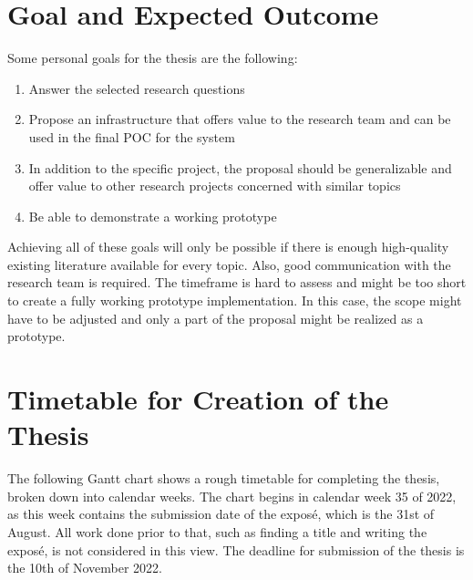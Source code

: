 \newpage
\section{Goal and Expected Outcome}

Some personal goals for the thesis are the following:
\begin{enumerate}
    \item Answer the selected research questions
    \item Propose an infrastructure that offers value to the research team
    and can be used in the final \ac{POC} for the system
    \item In addition to the specific project, the proposal should
    be generalizable and offer value to other research projects concerned with similar topics
    \item Be able to demonstrate a working prototype
\end{enumerate}

Achieving all of these goals will only be possible if there is enough high-quality existing literature
available for every topic. Also, good communication with the research team is required.
The timeframe is hard to assess and might be too short to create a fully working prototype implementation.
In this case, the scope might have to be adjusted and only a part of the 
proposal might be realized as a prototype.

\newpage
\section{Timetable for Creation of the Thesis}

The following Gantt chart shows a rough timetable for completing the thesis, broken down
into calendar weeks.
The chart begins in calendar week 35 of 2022, as this week contains the submission date of
the expos\'{e}, which is the 31st of August.
All work done prior to that, such as finding a title and writing the expos\'{e}, is not considered
in this view.
The deadline for submission of the thesis is the 10th of November 2022.

\

